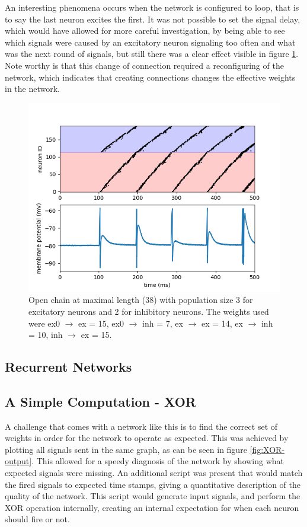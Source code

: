 \documentclass[10pt,a4paper]{article}
\begin{document}
An interesting phenomena occurs when the network is configured to loop, that is
to say the last neuron excites the first. It was not possible to set the
signal delay, which would have allowed for more careful investigation, by being
able to see which signals were caused by an excitatory neuron signaling too
often and what was the next round of signals, but still there was a clear effect
visible in figure \ref{fig:feed-forward-loop}. Note worthy is that this change
of connection required a reconfiguring of the network, which indicates that
creating connections changes the effective weights in the network.

\begin{figure}
    \centering
    \includegraphics[width=.5\textwidth]{figures/feedforward-signals-loop.png}
    \caption{Open chain at maximal length (38) with population size 3 for
    excitatory neurons and 2 for inhibitory neurons. The weights used were
    ex0 $\rightarrow$ ex = 15, ex0 $\rightarrow$ inh = 7, ex $\rightarrow$ ex =
    14, ex $\rightarrow$ inh = 10, inh $\rightarrow$ ex = 15.}
    \label{fig:feed-forward-loop}
\end{figure}

\subsection{Recurrent Networks}

\subsection{A Simple Computation - XOR}
A challenge that comes with a network like this is to find the correct set of
weights in order for the network to operate as expected. This was achieved by
plotting all signals sent in the same graph, as can be seen in figure
\ref{fig:XOR-output}. This allowed for a speedy diagnosis of the network by
showing what expected signals were missing. An additional script was present
that would match the fired signals to expected time stamps, giving a
quantitative description of the quality of the network. This script would
generate input signals, and perform the XOR operation internally, creating an
internal expectation for when each neuron should fire or not.
\end{document}
